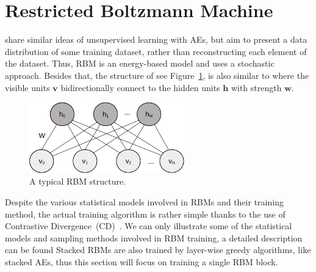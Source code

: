 \section{Restricted Boltzmann Machine}
\label{sec:rbm}
\protect{}
\protect{} share similar ideas of unsupervised learning with AEs, but aim to present a data distribution of some training dataset, rather than reconstructing each element of the dataset.
Thus, \protect{} RBM is an energy-based model and uses a stochastic approach.
Besides that, the structure of \protect{} \protect{} see Figure~\ref{fig:RBM}, is also similar to \protect{} \protect{} where the visible units $\mathbf{v}$ bidirectionally connect to the hidden units $\mathbf{h}$ with strength $\mathbf{w}$.


\begin{figure}[hbt]
	\centering
	\includegraphics[width=0.6\textwidth]{pics_sdlm/rbm_o.pdf}
	\caption{A typical RBM structure.}
	\label{fig:RBM}
\end{figure}

Despite the various statistical models involved in RBMs and their training method, the actual training algorithm is rather simple thanks to the use of Contrastive Divergence~(CD)~\citep{hinton2002training}.
We can only illustrate some of the statistical models and sampling methods involved in RBM training, a detailed description can be found \protect{} \protect{}\citep{fischer2012introduction}\protect{} 
Stacked RBMs are also trained by layer-wise greedy algorithms, like stacked AEs, thus this section will focus on training a single RBM block.

